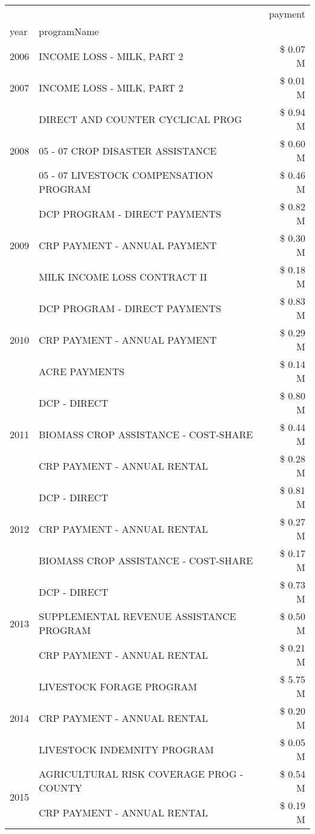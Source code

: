 \begin{tabular}{llr}
\toprule
 &  & payment \\
year & programName &  \\
\midrule
2006 & INCOME LOSS - MILK, PART 2 & \$ 0.07 M \\
\cline{1-3}
2007 & INCOME LOSS - MILK, PART 2 & \$ 0.01 M \\
\cline{1-3}
\multirow[t]{3}{*}{2008} & DIRECT AND COUNTER CYCLICAL PROG & \$ 0.94 M \\
 & 05 - 07 CROP DISASTER ASSISTANCE & \$ 0.60 M \\
 & 05 - 07 LIVESTOCK COMPENSATION PROGRAM & \$ 0.46 M \\
\cline{1-3}
\multirow[t]{3}{*}{2009} & DCP PROGRAM - DIRECT PAYMENTS & \$ 0.82 M \\
 & CRP PAYMENT - ANNUAL PAYMENT & \$ 0.30 M \\
 & MILK INCOME LOSS CONTRACT II & \$ 0.18 M \\
\cline{1-3}
\multirow[t]{3}{*}{2010} & DCP PROGRAM - DIRECT PAYMENTS & \$ 0.83 M \\
 & CRP PAYMENT - ANNUAL PAYMENT & \$ 0.29 M \\
 & ACRE PAYMENTS & \$ 0.14 M \\
\cline{1-3}
\multirow[t]{3}{*}{2011} & DCP - DIRECT & \$ 0.80 M \\
 & BIOMASS CROP ASSISTANCE - COST-SHARE & \$ 0.44 M \\
 & CRP PAYMENT - ANNUAL RENTAL & \$ 0.28 M \\
\cline{1-3}
\multirow[t]{3}{*}{2012} & DCP - DIRECT & \$ 0.81 M \\
 & CRP PAYMENT - ANNUAL RENTAL & \$ 0.27 M \\
 & BIOMASS CROP ASSISTANCE - COST-SHARE & \$ 0.17 M \\
\cline{1-3}
\multirow[t]{3}{*}{2013} & DCP - DIRECT & \$ 0.73 M \\
 & SUPPLEMENTAL REVENUE ASSISTANCE PROGRAM & \$ 0.50 M \\
 & CRP PAYMENT - ANNUAL RENTAL & \$ 0.21 M \\
\cline{1-3}
\multirow[t]{3}{*}{2014} & LIVESTOCK FORAGE PROGRAM & \$ 5.75 M \\
 & CRP PAYMENT - ANNUAL RENTAL & \$ 0.20 M \\
 & LIVESTOCK INDEMNITY PROGRAM & \$ 0.05 M \\
\cline{1-3}
\multirow[t]{3}{*}{2015} & AGRICULTURAL RISK COVERAGE PROG - COUNTY & \$ 0.54 M \\
 & CRP PAYMENT - ANNUAL RENTAL & \$ 0.19 M \\

\end{tabular}
